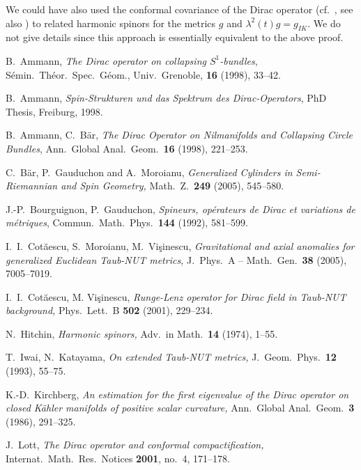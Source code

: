 \documentclass[12pt]{amsart}
\begin{document}
We could have also used the conformal covariance of the Dirac operator 
(cf.\ \cite{hitchin}, see also \cite{nistor}) to related 
harmonic spinors for the metrics
$g$ and $\lambda^2(t) g=g_{IK}$. We do not give details since 
this approach is essentially equivalent to the above proof.


\begin{thebibliography}{9}

 B.~Ammann,  {\sl The Dirac operator on collapsing
    $S^1$-bundles}, S\'emin.\ Th\'eor.\ Spec.\
    G\'eom.,  Univ.\ Grenoble, {\bf 16} (1998), 33--42.

 B.~Ammann,  {\it Spin-Strukturen und das Spektrum des
    Dirac-Operators}, PhD Thesis, Freiburg, 1998.

B.~Ammann, C.~B\"ar, 
{\sl The Dirac Operator on Nilmanifolds and Collapsing Circle Bundles}, 
Ann.\ Global Anal.\ Geom.\ {\bf 16} (1998), 221--253.

C.~B\"ar, P.~Gauduchon and A.~Moroianu,
{\sl Generalized Cylinders in Semi-Riemannian and Spin Geometry, }
Math.\ Z.\ {\bf 249} (2005), 545--580.

J.-P.~Bourguignon, P.~Gauduchon, {\sl Spineurs, op\'erateurs de {D}irac et
variations de m\'etriques}, Commun.\ Math.\ Phys.\ \textbf{144} (1992),
581--599.

I.~I.~Cot\u aescu, S.~Moroianu, M.~Vi\c sinescu, 
{\sl Gravitational and axial anomalies for generalized 
Euclidean Taub-NUT metrics, }
J.\ Phys.\ A -- Math.\ Gen.\ {\bf 38} (2005), 7005--7019.

I.~I.~Cot\u aescu, M. Vi\c sinescu,
{\sl Runge-Lenz operator for Dirac field in Taub-NUT background, }
Phys.\ Lett.\ B {\bf 502} (2001), 229--234.

N.~Hitchin,
{\sl Harmonic spinors, }
Adv.\ in Math.\ {\bf 14} (1974), 1--55.

T.~Iwai, N.~Katayama,
{\sl On extended Taub-NUT metrics, }
J.\ Geom.\ Phys.\ {\bf 12} (1993), 55--75.

K.-D.~Kirchberg, {\sl An estimation for the first eigenvalue of the
Dirac operator on closed K{\"a}hler manifolds of positive scalar curvature, } 
Ann.\ Global Anal.\ Geom.\ {\bf 3} (1986), 291--325. 

J.~Lott,
\emph{The Dirac operator and conformal compactification, }
Internat.\ Math.\ Res.\ Notices \textbf{2001}, no.\ 4, 171--178.


\end{thebibliography}
\end{document}
